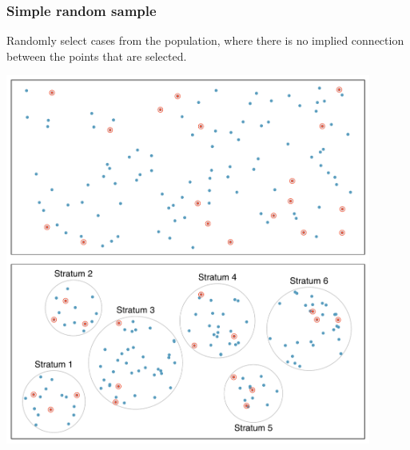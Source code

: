 
\begin{frame}
\frametitle{Simple random sample}

Randomly select cases from the population, where there is no implied connection between the points that are selected.

\begin{center}
\includegraphics[width=0.9\textwidth]{1-4_obs_studies_sampling/figures/sampling_methods/simple}
\end{center}

\end{frame}


